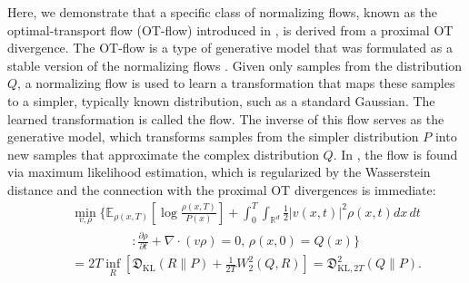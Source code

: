 \documentclass{amsart}
\newcommand{\R}{\mathbb{R}}
\theoremstyle{definition}
\newtheorem{example}[theorem]{Example}
\theoremstyle{remark}
\numberwithin{equation}{section}
\begin{document}
    Here, we demonstrate that a specific class of normalizing flows, known as the optimal-transport flow (OT-flow) introduced in \cite{onken2021ot}, is derived from a proximal OT divergence. The OT-flow is a type of generative model that was formulated as a stable version of the normalizing flows  \cite{rezende2015variational, tabak2010density, tabak2013family}. Given only samples from the distribution $Q$, a normalizing flow is used to learn a transformation that maps these samples to a simpler, typically known distribution, such as a standard Gaussian. The learned transformation is called the flow. The inverse of this flow serves as the generative model, which transforms samples from the simpler distribution $P$ into new samples that approximate the complex distribution $Q$. In \cite{onken2021ot}, the flow is found via maximum likelihood estimation, which is regularized by the Wasserstein distance and the connection with the proximal OT divergences is immediate:
     \begin{eqnarray}\label{opt:OT_flow}
        &&\min_{v,\rho} \Bigg\{\mathbb{E}_{\rho(x,T)}\left[\log \frac{\rho(x,T)}{P(x)} \right] + \int_0^T \int_{\R^d} \frac{1}{2} |v(x,t)|^2 \rho(x,t) dx \, dt\nonumber\\
        &&\hspace{2cm}:\frac{\partial \rho}{\partial t} + \nabla \cdot (v\rho) = 0,\, \rho(x,0) = Q(x)\Bigg\}\nonumber\\
        &&= 2T \inf_{R} \left[\mathfrak{D}_{\mathrm{KL}}(R\|P) + \frac{1}{2T} W_2^2(Q,R) \right]=\mathfrak{D}^2_{\mathrm{KL}, 2T}(Q\|P).
    \end{eqnarray}
\end{document}

